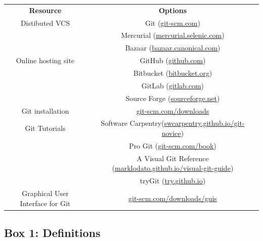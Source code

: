 \documentclass[10pt]{article}
\begin{document}
\begin{tabular}{ c c }
    \textbf{Resource} & \textbf{Options} \\
    Distibuted VCS & Git (\href{http://git-scm.com}{git-scm.com}) \\
                   & Mercurial (\href{http://mercurial.selenic.com}{mercurial.selenic.com}) \\
                   & Bazaar (\href{http://bazaar.canonical.com}{bazaar.canonical.com}) \\
    Online hosting site & GitHub (\href{https://github.com}{github.com}) \\
                        & Bitbucket (\href{https://bitbucket.org}{bitbucket.org}) \\
                        & GitLab (\href{https://about.gitlab.com}{gitlab.com}) \\
                        & Source Forge (\href{http://sourceforge.net}{sourceforge.net}) \\
    Git installation & \href{https://git-scm.com/downloads}{git-scm.com/downloads} \\
    Git Tutorials & Software Carpentry(\href{https://swcarpentry.github.io/git-novice}{swcarpentry.github.io/git-novice}) \\
                  & Pro Git (\href{https://git-scm.com/book}{git-scm.com/book}) \\
                  & A Visual Git Reference (\href{https://marklodato.github.io/visual-git-guide}{marklodato.github.io/visual-git-guide}) \\
                  & tryGit (\href{https://try.github.io}{try.github.io}) \\
    Graphical User Interface for Git & \href{https://git-scm.com/downloads/guis}{git-scm.com/downloads/guis} \\
\end{tabular}
  

\subsection{Box 1: Definitions}
\end{document}
